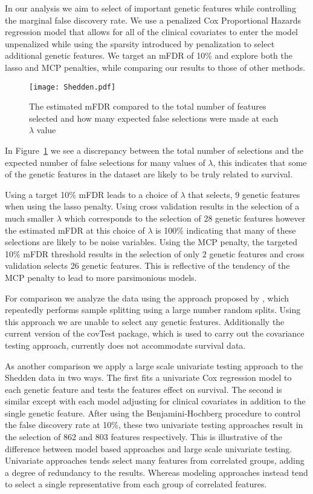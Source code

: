 In our analysis we aim to select of important genetic features while controlling the marginal false discovery rate.  We use a penalized Cox Proportional Hazards regression model that allows for all of the clinical covariates to enter the model unpenalized while using the sparsity introduced by penalization to select additional genetic features.  We target an mFDR of 10\% and explore both the lasso and MCP penalties, while comparing our results to those of other methods.

\begin{figure} [!htb]
 \centering
  \texttt{[image: Shedden.pdf]}
  \caption{\label{Fig:Shedden} The estimated mFDR compared to the total number of features selected and how many expected false selections were made at each $\lambda$ value}
\end{figure}

In Figure~\ref{Fig:Shedden} we see a discrepancy between the total number of selections and the expected number of false selections for many values of $\lambda$, this indicates that some of the genetic features in the dataset are likely to be truly related to survival. 

Using a target 10\% mFDR leads to a choice of $\lambda$ that selects, 9 genetic features when using the lasso penalty. Using cross validation results in the selection of a much smaller $\lambda$ which corresponds to the selection of 28 genetic features however the estimated mFDR at this choice of $\lambda$ is 100\% indicating that many of these selections are likely to be noise variables. Using the MCP penalty, the targeted 10\% mFDR threshold results in the selection of only 2 genetic features and cross validation selects 26 genetic features. This is reflective of the tendency of the MCP penalty to lead to more parsimonious models.

For comparison we analyze the data using the approach proposed by \citet{Meinshausen2009}, which repeatedly performs sample splitting using a large number random splits. Using this approach we are unable to select any genetic features. Additionally the current version of the covTest package, which is used to carry out the covariance testing approach, currently does not accommodate survival data.

As another comparison we apply a large scale univariate testing approach to the Shedden data in two ways. The first fits a univariate Cox regression model to each genetic feature and tests the features effect on survival.  The second is similar except with each model adjusting for clinical covariates in addition to the single genetic feature.  After using the Benjamini-Hochberg procedure to control the false discovery rate at 10\%, these two univariate testing approaches result in the selection of 862 and 803 features respectively. This is illustrative of the difference between model based approaches and large scale univariate testing. Univariate approaches tends select many features from correlated groups, adding a degree of redundancy to the results. Whereas modeling approaches instead tend to select a single representative from each group of correlated features.  

